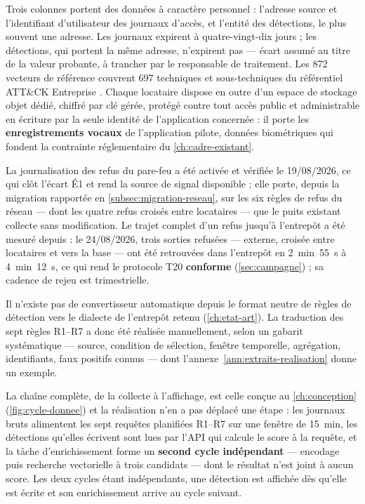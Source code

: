 Trois colonnes portent des données à caractère personnel : l'adresse source et l'identifiant
d'utilisateur des journaux d'accès, et l'entité des détections, le plus souvent une adresse. Les
journaux expirent à quatre-vingt-dix jours ; les détections, qui portent la même adresse, n'expirent
pas --- écart assumé au titre de la valeur probante, à trancher par le responsable de traitement.
Les 872 vecteurs de référence couvrent 697 techniques et sous-techniques du référentiel ATT\&CK
Entreprise \cite{mitre_attack}. Chaque locataire dispose en outre d'un espace de stockage objet
dédié, chiffré par clé gérée, protégé contre tout accès public et administrable en écriture par la
seule identité de l'application concernée : il porte les \textbf{enregistrements vocaux} de
l'application pilote, données biométriques qui fondent la contrainte réglementaire du \cref{ch:cadre-existant}.

\begin{alertbox}[boxsep=1pt, left=4pt, right=4pt, top=3pt, bottom=3pt]
La journalisation des refus du pare-feu a été activée et vérifiée le 19/08/2026, ce qui clôt
l'écart É1 et rend la source de signal disponible ; elle porte, depuis la migration rapportée en
\cref{subsec:migration-reseau}, sur les six règles de refus du réseau --- dont les quatre refus
croisés entre locataires --- que le puits existant collecte sans modification. Le trajet complet d'un refus jusqu'à l'entrepôt a été
mesuré depuis : le 24/08/2026, trois sorties refusées --- externe, croisée entre locataires et vers
la base --- ont été retrouvées dans l'entrepôt en 2~min~55~s à 4~min~12~s, ce qui rend le
protocole T20 \textbf{conforme} (\cref{sec:campagne}) ; sa cadence de rejeu est trimestrielle.
\end{alertbox}

Il n'existe pas de convertisseur automatique depuis le format neutre de règles de détection vers
le dialecte de l'entrepôt retenu (\cref{ch:etat-art}). La traduction des sept règles R1--R7 a donc été
réalisée manuellement, selon un gabarit systématique --- source, condition de sélection, fenêtre
temporelle, agrégation, identifiants, faux positifs connus --- dont
l'annexe~\ref{ann:extraits-realisation} donne un exemple.

La chaîne complète, de la collecte à l'affichage, est celle conçue au \cref{ch:conception}
(\cref{fig:cycle-donnee}) et la réalisation n'en a pas déplacé une étape : les journaux bruts
alimentent les sept requêtes planifiées R1--R7 sur une fenêtre de 15~min, les détections
qu'elles écrivent sont lues par l'API qui calcule le score à la requête, et la tâche
d'enrichissement forme un \textbf{second cycle indépendant} --- encodage puis recherche
vectorielle à trois candidats --- dont le résultat n'est joint à aucun score. Les deux cycles
étant indépendants, une détection est affichée dès qu'elle est écrite et son enrichissement
arrive au cycle suivant.

